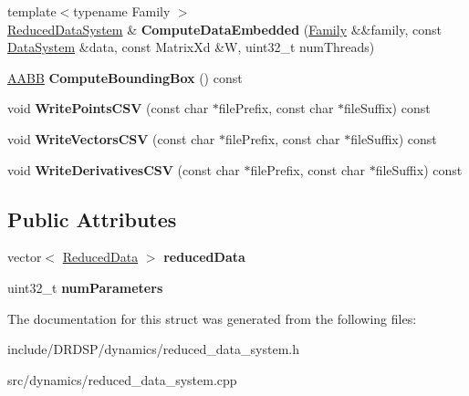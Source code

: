 \begin{DoxyCompactItemize}
\item 
\hypertarget{struct_d_r_d_s_p_1_1_reduced_data_system_a355ad1977811ebdf2924386c82c13f5c}{{\footnotesize template$<$typename Family $>$ }\\\hyperlink{struct_d_r_d_s_p_1_1_reduced_data_system}{Reduced\-Data\-System} \& {\bfseries Compute\-Data\-Embedded} (\hyperlink{struct_d_r_d_s_p_1_1_family}{Family} \&\&family, const \hyperlink{struct_d_r_d_s_p_1_1_data_system}{Data\-System} \&data, const Matrix\-Xd \&W, uint32\-\_\-t num\-Threads)}\label{struct_d_r_d_s_p_1_1_reduced_data_system_a355ad1977811ebdf2924386c82c13f5c}

\item 
\hypertarget{struct_d_r_d_s_p_1_1_reduced_data_system_a21853627f8229be7b5ec278faa31257e}{\hyperlink{struct_d_r_d_s_p_1_1_a_a_b_b}{A\-A\-B\-B} {\bfseries Compute\-Bounding\-Box} () const }\label{struct_d_r_d_s_p_1_1_reduced_data_system_a21853627f8229be7b5ec278faa31257e}

\item 
\hypertarget{struct_d_r_d_s_p_1_1_reduced_data_system_a3cee3fafe99a55ab69f54a97a6694b5b}{void {\bfseries Write\-Points\-C\-S\-V} (const char $\ast$file\-Prefix, const char $\ast$file\-Suffix) const }\label{struct_d_r_d_s_p_1_1_reduced_data_system_a3cee3fafe99a55ab69f54a97a6694b5b}

\item 
\hypertarget{struct_d_r_d_s_p_1_1_reduced_data_system_a90193676fbce0169bc7491ab686d79fa}{void {\bfseries Write\-Vectors\-C\-S\-V} (const char $\ast$file\-Prefix, const char $\ast$file\-Suffix) const }\label{struct_d_r_d_s_p_1_1_reduced_data_system_a90193676fbce0169bc7491ab686d79fa}

\item 
\hypertarget{struct_d_r_d_s_p_1_1_reduced_data_system_a75f66fe7b0df27640593380a60fa4a4e}{void {\bfseries Write\-Derivatives\-C\-S\-V} (const char $\ast$file\-Prefix, const char $\ast$file\-Suffix) const }\label{struct_d_r_d_s_p_1_1_reduced_data_system_a75f66fe7b0df27640593380a60fa4a4e}

\end{DoxyCompactItemize}
\subsection*{Public Attributes}
\begin{DoxyCompactItemize}
\item 
\hypertarget{struct_d_r_d_s_p_1_1_reduced_data_system_ae4b8454c60cadde78da603168aa840f4}{vector$<$ \hyperlink{struct_d_r_d_s_p_1_1_reduced_data}{Reduced\-Data} $>$ {\bfseries reduced\-Data}}\label{struct_d_r_d_s_p_1_1_reduced_data_system_ae4b8454c60cadde78da603168aa840f4}

\item 
\hypertarget{struct_d_r_d_s_p_1_1_reduced_data_system_a18caccb6ac437c79aeb23e8b6c57389c}{uint32\-\_\-t {\bfseries num\-Parameters}}\label{struct_d_r_d_s_p_1_1_reduced_data_system_a18caccb6ac437c79aeb23e8b6c57389c}

\end{DoxyCompactItemize}


The documentation for this struct was generated from the following files\-:\begin{DoxyCompactItemize}
\item 
include/\-D\-R\-D\-S\-P/dynamics/reduced\-\_\-data\-\_\-system.\-h\item 
src/dynamics/reduced\-\_\-data\-\_\-system.\-cpp\end{DoxyCompactItemize}
